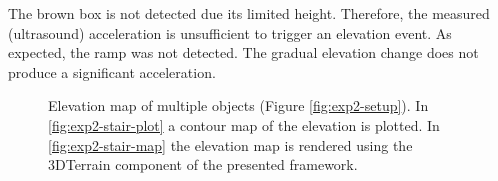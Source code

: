 The brown box is not detected due its limited height.
Therefore, the measured (ultrasound) acceleration is unsufficient to trigger an elevation event.
As expected, the ramp was not detected.
The gradual elevation change does not produce a significant acceleration.

\begin{figure}[htb!]
  \begin{center}

 \end{center}
  \caption{Elevation map of multiple objects (Figure \ref{fig:exp2-setup}). In \ref{fig:exp2-stair-plot} a contour map of the elevation is plotted. In \ref{fig:exp2-stair-map} the elevation map is rendered using the 3DTerrain component of the presented framework.}
  \label{fig:exp2-2-results}
\end{figure}